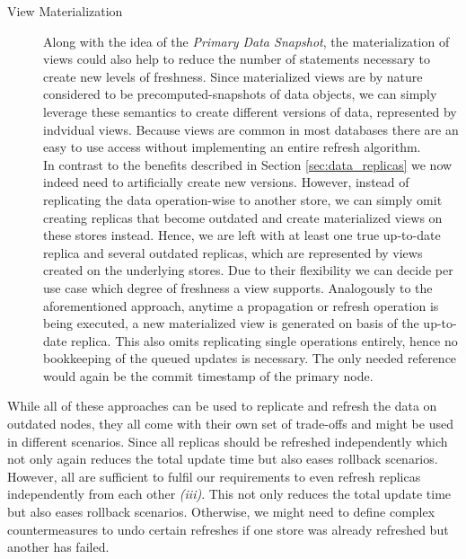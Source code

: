 \begin{description}
    \item [View Materialization]
    Along with the idea of the \emph{Primary Data Snapshot}, the materialization of views could also help to reduce the number of statements necessary to create new levels of freshness.
    Since materialized views are by nature considered to be precomputed-snapshots of data objects, we can simply leverage these semantics to create different versions of data, 
    represented by indvidual views.
    Because views are common in most databases there are an easy to use access without implementing an entire refresh algorithm.\\
    In contrast to the benefits described in Section \ref{sec:data_replicas} we now indeed need to artificially create new versions.
    However, instead of replicating the data operation-wise to another store, we can simply omit creating replicas that become outdated and create materialized views on these 
    stores instead. Hence, we are left with at least one true up-to-date replica and several outdated replicas, which are represented by views created on the underlying stores.
    Due to their flexibility we can decide per use case which degree of freshness a view supports. 
    Analogously to the aforementioned approach, anytime a propagation or refresh operation is being executed, a new materialized view is generated on basis of the up-to-date replica.
    This also omits replicating single operations entirely, hence no bookkeeping of the queued updates is necessary. 
    The only needed reference would again be the commit timestamp of the primary node. 


\end{description}


While all of these approaches can be used to replicate and refresh the data on outdated nodes,
they all come with their own set of trade-offs and might be used in different scenarios.
Since all replicas should be refreshed independently which not only again reduces the total update time but also eases rollback scenarios.
However, all are sufficient to fulfil our requirements to even refresh replicas independently from each other \textit{(iii)}.
This not only reduces the total update time but also eases rollback scenarios. 
Otherwise, we might need to define complex countermeasures to undo certain refreshes if one store was already refreshed but another has failed.






